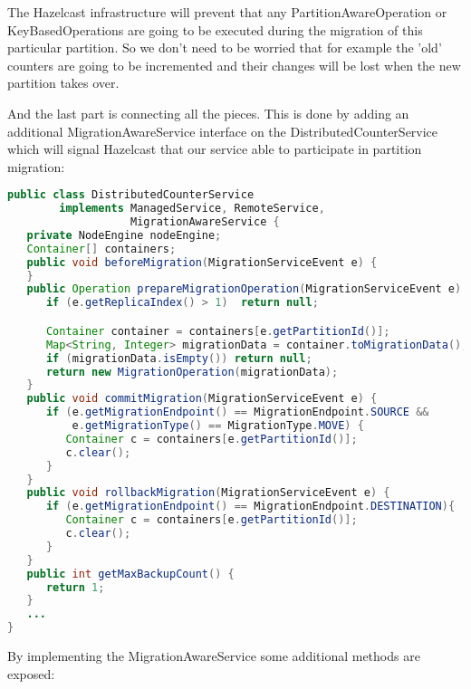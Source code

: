 The Hazelcast infrastructure will prevent that any PartitionAwareOperation or KeyBasedOperations are going to be executed during the migration of this particular partition. So we don't need to be worried that for example the 'old' counters are going to be incremented and their changes will be lost when the new partition takes over.

And the last part is connecting all the pieces. This is done by adding an additional MigrationAwareService interface on the DistributedCounterService which will signal Hazelcast that our service able to participate in partition migration:
\begin{lstlisting}[language=java]
public class DistributedCounterService 
        implements ManagedService, RemoteService, 
                   MigrationAwareService {
   private NodeEngine nodeEngine;
   Container[] containers;
   public void beforeMigration(MigrationServiceEvent e) {
   } 
   public Operation prepareMigrationOperation(MigrationServiceEvent e) {
      if (e.getReplicaIndex() > 1)  return null;

      Container container = containers[e.getPartitionId()];
      Map<String, Integer> migrationData = container.toMigrationData();
      if (migrationData.isEmpty()) return null;
      return new MigrationOperation(migrationData);
   }
   public void commitMigration(MigrationServiceEvent e) {
      if (e.getMigrationEndpoint() == MigrationEndpoint.SOURCE && 
          e.getMigrationType() == MigrationType.MOVE) {
         Container c = containers[e.getPartitionId()];
         c.clear();
      }
   }
   public void rollbackMigration(MigrationServiceEvent e) {
      if (e.getMigrationEndpoint() == MigrationEndpoint.DESTINATION){
         Container c = containers[e.getPartitionId()];
         c.clear();
      }
   }
   public int getMaxBackupCount() {
      return 1;
   }
   ...
}
\end{lstlisting}
By implementing the MigrationAwareService some additional methods are exposed:
